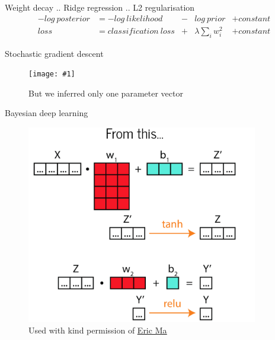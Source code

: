 \documentclass{beamer}
\newcommand{\fitfigure}[1]{\centering\texttt{[image: \#1]}}
\newcommand{\mdlink}[2]{\href{#2}{\underline{#1}}}
\begin{document}
\begin{frame}{Weight decay .. Ridge regression .. L2 regularisation}
	\begin{align*}
		-log \ posterior & =  -log \ likelihood    & - & log \ prior          & + constant \\
		loss             & = classification \ loss & + & \lambda \sum_i w_i^2 & + constant 
	\end{align*}
\end{frame}

\begin{frame}{Stochastic gradient descent}
	\begin{figure}
		\fitfigure{im/sgd.png}
		\caption{But we inferred only one parameter vector}
	\end{figure}
\end{frame}

\begin{frame}
	\centerline{Bayesian deep learning}
\end{frame}

\begin{frame}
	\begin{figure}
		\centering
		\includegraphics[width = 0.9\textwidth]{im/going_bayesian1.png}
		\caption{Used with kind permission of \mdlink{Eric Ma}{https://ericmjl.github.io/}}
	\end{figure}
\end{frame}
\end{document}
